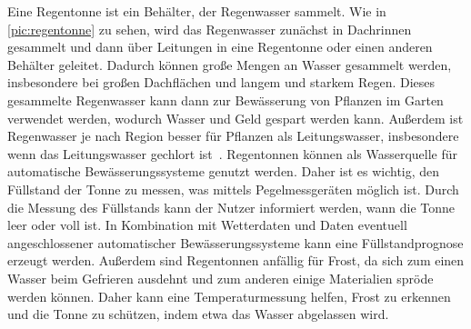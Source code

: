 Eine Regentonne ist ein Behälter, der Regenwasser sammelt.
Wie in \cref{pic:regentonne} zu sehen, wird das Regenwasser zunächst in Dachrinnen gesammelt und dann über Leitungen in eine Regentonne oder einen anderen Behälter geleitet.
Dadurch können große Mengen an Wasser gesammelt werden, insbesondere bei großen Dachflächen und langem und starkem Regen.
Dieses gesammelte Regenwasser kann dann zur Bewässerung von Pflanzen im Garten verwendet werden, wodurch Wasser und Geld gespart werden kann.
Außerdem ist Regenwasser je nach Region besser für Pflanzen als Leitungswasser, insbesondere wenn das Leitungswasser gechlort ist~\cite{PflanzenChlor}.
Regentonnen können als Wasserquelle für automatische Bewässerungssysteme genutzt werden.
Daher ist es wichtig, den Füllstand der Tonne zu messen, was mittels Pegelmessgeräten möglich ist.
Durch die Messung des Füllstands kann der Nutzer informiert werden, wann die Tonne leer oder voll ist.
In Kombination mit Wetterdaten und Daten eventuell angeschlossener automatischer Bewässerungssysteme kann eine Füllstandprognose erzeugt werden.
Außerdem sind Regentonnen anfällig für Frost, da sich zum einen Wasser beim Gefrieren ausdehnt und zum anderen einige Materialien spröde werden können.
Daher kann eine Temperaturmessung helfen, Frost zu erkennen und die Tonne zu schützen, indem etwa das Wasser abgelassen wird.


